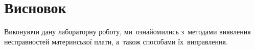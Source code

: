 \documentclass[
	a4paper,
	oneside,
	BCOR = 10mm,
	DIV = 12,
	12pt,
	headings = normal,
]{scrartcl}
\begin{document}
	\section{Висновок}
		Виконуючи дану лабораторну роботу, ми~ознайомились з~методами виявлення несправностей материнської плати, а~також способами їх~виправлення.
\end{document}
